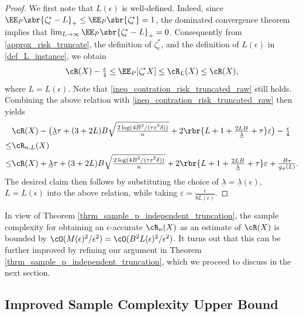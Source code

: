 \documentclass[9pt]{article} %
\numberwithin{equation}{section}
\newcommand{\yan}[1]{{\color{blue} [#1]}}
\renewcommand{\frac}[2]{\tfrac{#1}{#2}}
\begin{document}
\begin{proof}
We first note that $L(\epsilon)$ is well-defined. Indeed, since $\EE_P \sbr{\zeta^*_\epsilon - L}_+ \leq \EE_P \sbr{\zeta^*_\epsilon} = 1$, the dominated convergence theorem implies that 
$\lim_{L \to \infty} \EE_P \sbr{\zeta^*_\epsilon - L}_+  = 0$. 
Consequently from \eqref{approx_risk_truncate}, the definition of $\zeta_\epsilon^*$, and the definition of $L(\epsilon)$ in \eqref{def_L_instance},
we obtain
\begin{align*}
 \cR(X) - \frac{\epsilon}{4} \leq  \EE_P [\zeta^*_\epsilon X ]  \leq \cR_L(X) \leq \cR(X) , 
\end{align*}
where $L = L(\epsilon)$. 
Note that \eqref{ineq_contration_risk_truncated_raw} still holds. 
Combining the above relation with \eqref{ineq_contration_risk_truncated_raw} then yields 
\begin{align*}
&  \cR(X)  - \big({
 \underline{\lambda} \tau + 
(3+2L)B \sqrt{\frac{2 \log(4B^2/(\tau \varepsilon^2 \delta))}{n}} 
+ 2  \rbr{L+1 +  \frac{2LB}{\underline{\lambda}} + \tau} \varepsilon
} \big)- \frac{\epsilon}{4}  \\
   \leq  & 
 \cR_{n,L}(X)  \\
 \leq  &  \cR(X) + \underline{\lambda} \tau + 
(3+2L)B \sqrt{\frac{2 \log(4B^2/(\tau \varepsilon^2 \delta))}{n}} 
+ 2  \rbr{L+1 +  \frac{2LB}{\underline{\lambda}} + \tau} \varepsilon
+ \frac{B\tau}{g_\phi(L)} .
\end{align*}
The desired claim then follows by substituting the choice of 
$\underline{\lambda} = \underline{\lambda}(\epsilon)$,
$L = L(\epsilon)$ into the above relation, 
while taking 
$\varepsilon = \frac{\epsilon}{8 \overline{L}(\epsilon)}$. 
\end{proof}


In view of Theorem \ref{thrm_sample_p_independent_truncation}, the sample complexity for obtaining an $\epsilon$-accurate $\cR_n(X)$ as an estimate of $\cR(X)$ is bounded by 
$\cO(M(\epsilon)^2/\epsilon^2) = \cO(B^2 L(\epsilon)^2 / \epsilon^2)$. 
It turns out that this can be further improved by refining our argument in Theorem \ref{thrm_sample_p_independent_truncation}, which we proceed to discuss in the next section. 


%






\subsection{Improved Sample Complexity Upper Bound}\label{subsec_improved_sample_complexity}
\end{document}
